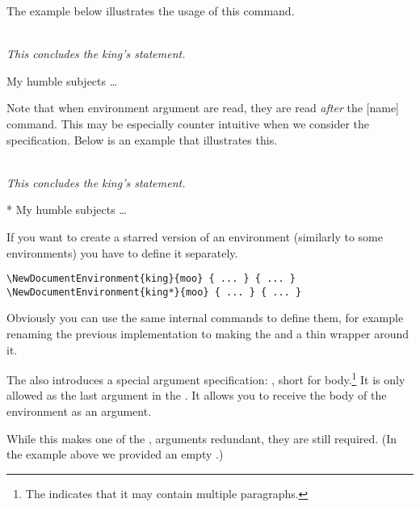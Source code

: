 The example below illustrates the usage of this command.
\begin{example}
 {%
  \\[1em]%
  \emph{This concludes
    the king's statement.}%
}

\begin{king}
My humble subjects \ldots
\end{king}
\end{example}

Note that when environment argument are read, they are read \emph{after} the
[name] command. This may be especially counter intuitive when we
consider the  specification. Below is an example that illustrates
this.

\begin{example}
 {%
  \\[1em]%
  \emph{This concludes
    the king's statement.}%
}

\begin{king}*
My humble subjects \ldots
\end{king}
\end{example}

If you want to create a starred version of an environment (similarly to some
 environments) you have to define it separately.
\begin{verbatim}
\NewDocumentEnvironment{king}{moo} { ... } { ... }
\NewDocumentEnvironment{king*}{moo} { ... } { ... }
\end{verbatim}
Obviously you can use the same internal commands to define them, for example
renaming the previous implementation to  making the
 and  a thin wrapper around it.

The  also introduces a special argument
specification: , short for body.\footnote{The \cargv{+} indicates
that it may contain multiple paragraphs.} It is only allowed as the last
argument in the . It allows you to receive the body of the
environment as an argument.
While this makes one of the ,  arguments redundant,
they are still required. (In the example above we provided an empty .)

